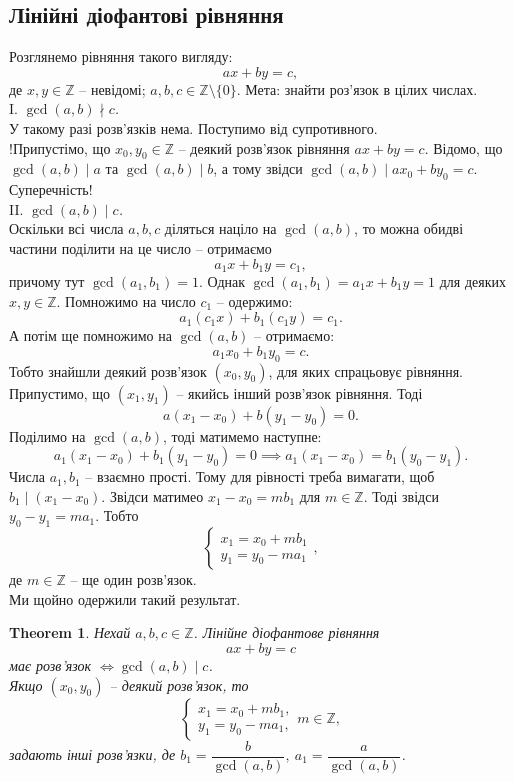 \documentclass[a4paper, 10pt]{article}
\theoremstyle{theoremdd}
\newtheorem{theorem}{Theorem}[subsection]
\theoremstyle{theoremdd}
\theoremstyle{theoremdd}
\theoremstyle{theoremdd}
\theoremstyle{theoremdd}
\theoremstyle{theoremdd}
\theoremstyle{theoremdd}
\theoremstyle{theoremdd}
\begin{document}
\subsection{Лінійні діофантові рівняння}
Розглянемо рівняння такого вигляду:
\begin{equation*}
ax + by = c,
\end{equation*}
де $x,y \in \mathbb{Z}$ -- невідомі; $a,b,c \in \mathbb{Z} \setminus \{0\}$. Мета: знайти роз'язок в цілих числах.
\bigskip \\
I. \textit{$\gcd(a,b) \nmid c$.}\\
У такому разі розв'язків нема. Поступимо від супротивного.\\
!Припустімо, що $x_0,y_0 \in \mathbb{Z}$ -- деякий розв'язок рівняння $ax+by=c$. Відомо, що $\gcd(a,b) \mid a$ та $\gcd(a,b) \mid b$, а тому звідси $\gcd(a,b) \mid ax_0 + by_0 = c$. Суперечність!
\bigskip \\
II. \textit{$\gcd(a,b) \mid c$.}\\
Оскільки всі числа $a,b,c$ діляться націло на $\gcd(a,b)$, то можна обидві частини поділити на це число -- отримаємо
\[
a_1x + b_1y = c_1,
\]
причому тут $\gcd(a_1,b_1) = 1$. Однак $\gcd(a_1,b_1) = a_1 x + b_1 y = 1$ для деяких $x,y \in \mathbb{Z}$. Помножимо на число $c_1$ -- одержимо:
\[
a_1 (c_1x) + b_1 (c_1y) = c_1.
\]
А потім ще помножимо на $\gcd (a,b)$ -- отримаємо:
\[
a_1 x_0 + b_1 y_0 = c.
\]
Тобто знайшли деякий розв'язок $(x_0,y_0)$, для яких спрацьовує рівняння.
\bigskip \\
Припустимо, що $(x_1,y_1)$ -- якийсь інший розв'язок рівняння. Тоді \[
a(x_1-x_0) + b(y_1-y_0) = 0.
\]
Поділимо на $\gcd(a,b)$, тоді матимемо наступне:
\[
a_1 (x_1-x_0) + b_1(y_1-y_0) = 0 \implies a_1(x_1-x_0) = b_1(y_0-y_1).
\]
Числа $a_1,b_1$ -- взаємно прості. Тому для рівності треба вимагати, щоб $b_1 \mid (x_1-x_0)$. Звідси матимео $x_1 - x_0 = mb_1$ для $m \in \mathbb{Z}$. Тоді звідси $y_0 - y_1 = ma_1$. Тобто
\[
\begin{cases} x_1 = x_0 + mb_1 \\ y_1 = y_0 - ma_1 \end{cases},
\] де $m \in \mathbb{Z}$ -- ще один розв'язок.
\bigskip \\
Ми щойно одержили такий результат.
\begin{theorem}
Нехай $a,b,c \in \mathbb{Z}$. Лінійне діофантове рівняння
\begin{equation}
ax + by = c
\end{equation}
має розв'язок $\iff \gcd(a,b) \mid c$.\\ Якщо $(x_0,y_0)$ -- деякий розв'язок, то\\
\[ \begin{cases} x_1 = x_0 + mb_1, \\ y_1 = y_0 - ma_1, \end{cases} m \in \mathbb{Z}, \]
задають інші розв'язки, де $b_1 = \dfrac{b}{\gcd(a,b)},\ a_1 = \dfrac{a}{\gcd(a,b)}$.
\end{theorem}
\end{document}

